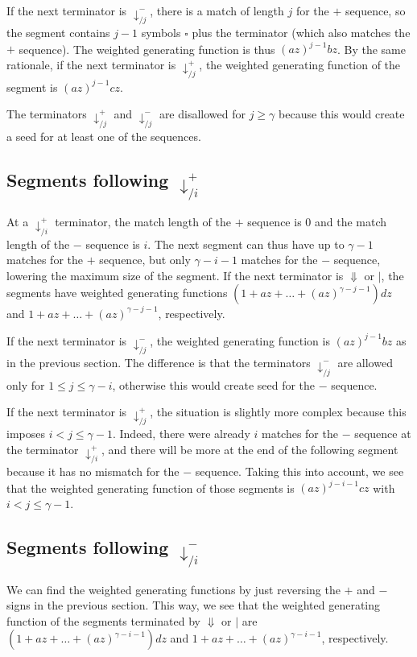 \documentclass{article}
\begin{document}
If the next terminator is $\downarrow_{/j}^-$, there is a match of length
$j$ for the $+$ sequence, so the segment contains $j-1$ symbols $\square$
plus the terminator (which also matches the $+$ sequence). The weighted
generating function is thus $(az)^{j-1}bz$. By the same rationale, if the
next terminator is $\downarrow_{/j}^+$, the weighted generating function
of the segment is $(az)^{j-1}cz$.

The terminators $\downarrow_{/j}^+$ and $\downarrow_{/j}^-$ are disallowed
for $j \geq \gamma$ because this would create a seed for at least one of
the sequences.

\subsection{Segments following $\downarrow_{/i}^+$}

At a $\downarrow_{/i}^+$ terminator, the match length of the $+$ sequence
is 0 and the match length of the $-$ sequence is $i$. The next segment can
thus have up to $\gamma-1$ matches for the $+$ sequence, but only
$\gamma-i-1$ matches for the $-$ sequence, lowering the maximum size of
the segment. If the next terminator is $\Downarrow$ or $|$, the segments
have weighted generating functions $(1 + az + \ldots +
(az)^{\gamma-j-1})dz$ and $1 + az + \ldots + (az)^{\gamma-j-1}$,
respectively.

If the next terminator is $\downarrow_{/j}^-$, the weighted generating
function is $(az)^{j-1}bz$ as in the previous section. The difference is
that the terminators $\downarrow_{/j}^-$ are allowed only for $1 \leq j
\leq \gamma-i$, otherwise this would create seed for the $-$ sequence.

If the next terminator is $\downarrow_{/j}^+$, the situation is slightly
more complex because this imposes $i < j \leq \gamma-1$. Indeed,
there were already $i$ matches for the $-$ sequence at the terminator
$\downarrow_{/i}^+$, and there will be more at the end of the following
segment because it has no mismatch for the $-$ sequence. Taking this into
account, we see that the weighted generating function of those segments is
$(az)^{j-i-1}cz$ with $i < j \leq \gamma-1$.

\subsection{Segments following $\downarrow_{/i}^-$}

We can find the weighted generating functions by just reversing the $+$
and $-$ signs in the previous section. This way, we see that the weighted
generating function of the segments terminated by $\Downarrow$ or $|$ are
$(1 + az + \ldots + (az)^{\gamma-i-1})dz$ and $1 + az + \ldots +
(az)^{\gamma-i-1}$, respectively.
\end{document}
